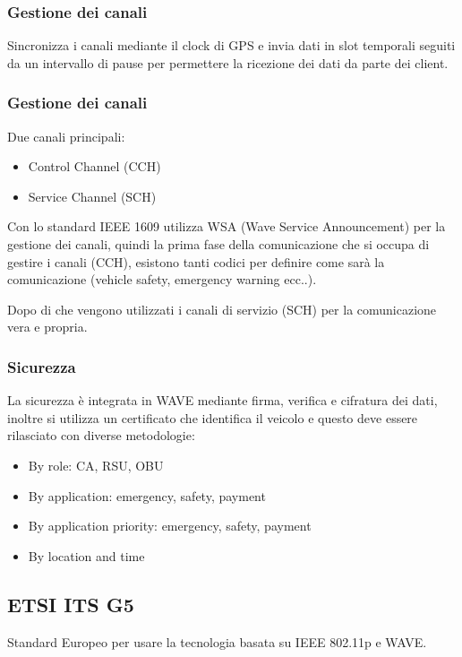 \subsubsection{Gestione dei canali}

Sincronizza i canali mediante il clock di GPS e invia dati in slot temporali seguiti da un intervallo
di pause per permettere la ricezione dei dati da parte dei client.


\subsubsection{Gestione dei canali}
Due canali principali:
\begin{itemize}
	\item Control Channel (CCH)
	\item Service Channel (SCH)
\end{itemize}



Con lo standard IEEE 1609 utilizza WSA (Wave Service Announcement) per la gestione dei canali,
quindi la prima fase della comunicazione che si occupa di gestire i canali (CCH), esistono tanti codici per definire
come sar\`a la comunicazione (vehicle safety, emergency warning ecc..).

Dopo di che vengono utilizzati i canali di servizio (SCH) per la comunicazione vera e propria.


\subsubsection{Sicurezza}

La sicurezza è integrata in WAVE mediante firma, verifica e cifratura dei dati, inoltre si utilizza
un certificato che identifica il veicolo e questo deve essere rilasciato con diverse metodologie:
\begin{itemize}
	\item By role: CA, RSU, OBU
	\item By application: emergency, safety, payment
	\item By application priority: emergency, safety, payment
	\item By location and time
\end{itemize}


\subsection{ETSI ITS G5}
Standard Europeo per usare la tecnologia basata su IEEE 802.11p e WAVE.

